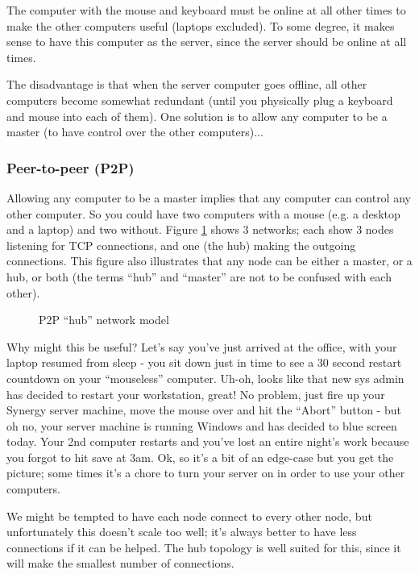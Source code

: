 The computer with the mouse and keyboard must be online at all other times to
make the other computers useful (laptops excluded). To some degree, it makes 
sense to have this computer as the server, since the server should be online
at all times.

The disadvantage is that when the server computer goes offline, all other 
computers become somewhat redundant (until you physically plug a keyboard
and mouse into each of them). One solution is to allow any computer to be a 
master (to have control over the other computers)...

\subsubsection{Peer-to-peer (P2P)}


Allowing any computer to be a master implies that any computer can control
any other computer. So you could have two computers with a mouse (e.g. a 
desktop and a laptop) and two without. Figure \ref{fig:p2p} shows 3 networks;
each show 3 nodes listening for TCP connections, and one (the hub) making the
outgoing connections. This figure also illustrates that any node can be either
a master, or a hub, or both (the terms ``hub'' and ``master'' are not to be 
confused with each other).

\begin{figure}[ht!]
  \centering
  
  \caption{P2P ``hub'' network model}
  \label{fig:p2p}
\end{figure}

Why might this be useful? Let's say you've just arrived at the
office, with your laptop resumed from sleep - you sit down just in time to see
a 30 second restart countdown on your ``mouseless'' computer. Uh-oh, looks like
that new sys admin has decided to restart your workstation, great! No problem, 
just fire up your Synergy server machine, move the mouse over and hit the 
``Abort'' button - but oh no, your server machine is running Windows and has 
decided to blue screen today. Your 2nd computer restarts and you've lost an 
entire night's work because you forgot to hit save at 3am. Ok, so it's a bit 
of an edge-case but you get the picture; some times it's a chore to turn your
server on in order to use your other computers.

We might be tempted to have each node connect to every other node, but
unfortunately this doesn't scale too well; it's always better to have less
connections if it can be helped. The hub topology is well suited for this,
since it will make the smallest number of connections.

